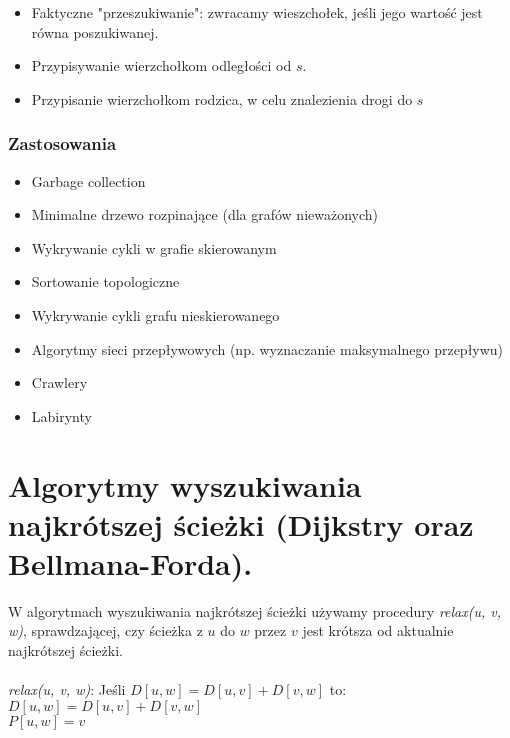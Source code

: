 \documentclass[main.tex]{subfiles}
\begin{document}
    \begin{itemize}
        \item Faktyczne "przeszukiwanie": zwracamy wieszchołek, jeśli jego wartość jest
        równa poszukiwanej.
        \item Przypisywanie wierzchołkom odległości od $s$.
        \item Przypisanie wierzchołkom rodzica, w celu znalezienia drogi do $s$
    \end{itemize}

    \subsubsection{Zastosowania}

    \begin{itemize}
        \item Garbage collection
        \item Minimalne drzewo rozpinające (dla grafów nieważonych)
        \item Wykrywanie cykli w grafie skierowanym
        \item Sortowanie topologiczne
        \item Wykrywanie cykli grafu nieskierowanego
        \item Algorytmy sieci przepływowych (np. wyznaczanie maksymalnego przepływu)
        \item Crawlery
        \item Labirynty
    \end{itemize}

    \newpage

    \section{Algorytmy wyszukiwania najkrótszej ścieżki (Dijkstry oraz Bellmana-Forda).}

    W algorytmach wyszukiwania najkrótszej ścieżki używamy procedury \textit{relax(u, v, w)},
    sprawdzającej, czy ścieżka z $u$ do $w$ przez $v$ jest krótsza od aktualnie najkrótszej
    ścieżki.
    \\~\\
    \textit{relax(u, v, w)}:
    \vskip 0pt Jeśli $D[u, w] = D[u, v] + D[v, w]$ to:\\
    \hspace*{1cm} $D[u, w] = D[u, v] + D[v, w]$\\
    \hspace*{1cm} $P[u, w] = v$\\
\end{document}
